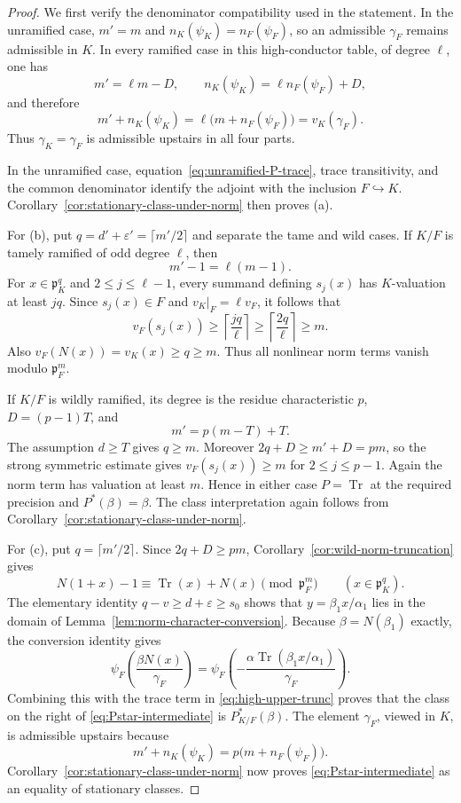 \documentclass[11pt]{amsart}
\theoremstyle{definition}
\theoremstyle{remark}
\newcommand{\p}{\mathfrak p}
\newcommand{\Tr}{\operatorname{Tr}}
\begin{document}
\begin{proof}
We first verify the denominator compatibility used in the statement.
In the unramified case,
$m'=m$ and $n_K(\psi_K)=n_F(\psi_F)$, so an admissible
$\gamma_F$ remains admissible in $K$.  In every ramified case in this
high-conductor table, of degree $\ell$, one has
\[
 m'=\ell m-D,
 \qquad n_K(\psi_K)=\ell n_F(\psi_F)+D,
\]
and therefore
\[
 m'+n_K(\psi_K)=\ell\bigl(m+n_F(\psi_F)\bigr)
 =v_K(\gamma_F).
\]
Thus $\gamma_K=\gamma_F$ is admissible upstairs in all four parts.

In the unramified case, equation~\eqref{eq:unramified-P-trace}, trace
transitivity, and the common denominator identify the adjoint with the
inclusion $F\hookrightarrow K$.
Corollary~\ref{cor:stationary-class-under-norm} then proves (a).

For (b), put $q=d'+\varepsilon'=\lceil m'/2\rceil$ and separate
the tame and wild cases.  If $K/F$ is tamely ramified of odd degree
$\ell$, then
\[
 m'-1=\ell(m-1).
\]
For $x\in\p_K^q$ and $2\le j\le\ell-1$, every summand defining
$s_j(x)$ has $K$-valuation at least $jq$.  Since $s_j(x)\in F$ and
$v_K|_F=\ell v_F$, it follows that
\[
 v_F(s_j(x))\ge\left\lceil\frac{jq}{\ell}\right\rceil
 \ge\left\lceil\frac{2q}{\ell}\right\rceil\ge m.
\]
Also $v_F(N(x))=v_K(x)\ge q\ge m$.  Thus all nonlinear norm terms
vanish modulo $\p_F^m$.

If $K/F$ is wildly ramified, its degree is the residue characteristic
$p$, $D=(p-1)T$, and
\[
 m'=p(m-T)+T.
\]
The assumption $d\ge T$ gives $q\ge m$.  Moreover
$2q+D\ge m'+D=pm$, so the strong symmetric estimate gives
$v_F(s_j(x))\ge m$ for $2\le j\le p-1$.  Again the norm term has
valuation at least $m$.  Hence in either case $P=\Tr$ at the required
precision and $P^*(\beta)=\beta$.  The class interpretation again
follows from Corollary~\ref{cor:stationary-class-under-norm}.

For (c), put $q=\lceil m'/2\rceil$.  Since
$2q+D\ge pm$, Corollary~\ref{cor:wild-norm-truncation} gives
\begin{equation}\label{eq:high-upper-trunc}
 N(1+x)-1\equiv\Tr(x)+N(x)\pmod{\p_F^m}
 \qquad(x\in\p_K^q).
\end{equation}
The elementary identity
$q-v\ge d+\varepsilon\ge s_0$ shows that
$y=\beta_1x/\alpha_1$ lies in the domain of
Lemma~\ref{lem:norm-character-conversion}.  Because
$\beta=N(\beta_1)$ exactly, the conversion identity gives
\[
 \psi_F\!\left(\frac{\beta N(x)}{\gamma_F}\right)
 =\psi_F\!\left(-\frac{\alpha\Tr(\beta_1x/\alpha_1)}
                         {\gamma_F}\right).
\]
Combining this with the trace term in
\eqref{eq:high-upper-trunc} proves that the class on the right of
\eqref{eq:Pstar-intermediate} is $P^*_{K/F}(\beta)$.  The element
$\gamma_F$, viewed in $K$, is admissible upstairs because
\[
 m'+n_K(\psi_K)=p\bigl(m+n_F(\psi_F)\bigr).
\]
Corollary~\ref{cor:stationary-class-under-norm} now proves
\eqref{eq:Pstar-intermediate} as an equality of stationary classes.


\end{proof}
\end{document}
